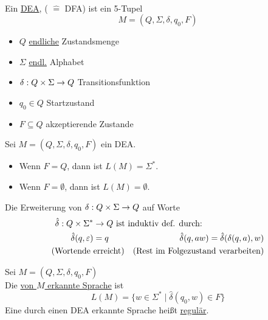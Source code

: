 \
\begin{Def}
	Ein \underline{\acf{DEA}}, ( $\hat=$ \acl{DFA}) ist ein 5-Tupel
	\[ M= (Q,\Sigma,\delta,q_0,F) \]
	\begin{itemize}
		\item $Q$ \underline{endliche} Zustandsmenge
		\item $\Sigma$ \underline{endl.} Alphabet
		\item $\delta:Q\x\Sigma\->Q$ Transitionsfunktion
		\item $q_0\in Q$ Startzustand
		\item $F\subseteq Q$ akzeptierende Zustande
	\end{itemize}
\end{Def}

\begin{Bsp}
    Sei $M=(Q,\Sigma,\delta,q_0,F)$ ein DEA.
    \begin{itemize}
    \item Wenn $F=Q$, dann ist $L(M)=\Sigma^*$.
    \item Wenn $F=\emptyset$, dann ist $L(M)=\emptyset$.
    \end{itemize}
\end{Bsp}
\begin{Def}[name={[Erweiterung von $\delta$ auf Worte]}]
	Die Erweiterung von $\delta:Q\x\Sigma\->Q$ auf Worte
	\begin{align*}
		\hat{\delta}: Q\x\Sigma^*&\->Q\ \rlap{ist induktiv def. durch:}\\
		\hat\delta(q,\Eps) &=q & \hat\delta(q,aw)=\hat\delta(\delta(q,a),w)\\
		(\text{Wortende\ }&\text{erreicht}) & (\text{Rest im Folgezustand verarbeiten})
	\end{align*}
\end{Def}
\begin{Def}[name={[Die durch einen \acs*{DEA} erkannte Sprache]}]
	Sei $M=(Q,\Sigma,\delta,q_0,F)$\\
	Die \underline{von $M$ erkannte Sprache} ist
	\[ L(M) = \{ w\in\Sigma^* \mid \hat\delta(q_0,w)\in F \} \]
	Eine durch einen \ac{DEA} erkannte Sprache heißt \underline{regulär}.
\end{Def}
